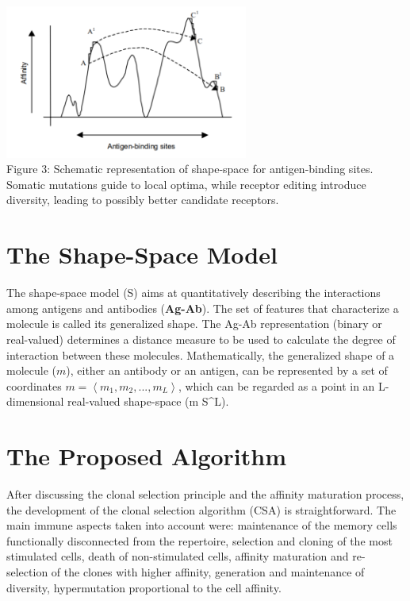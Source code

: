 \documentclass{article}
\begin{document}
\begin{center} 
\includegraphics[width=8cm,clip]{images/cj_somatic_muta.png}\\
\caption{Figure 3: Schematic representation of shape-space for antigen-binding sites. Somatic mutations guide to local optima, while receptor editing introduce diversity, leading to possibly better candidate receptors.}	
\end{center} 


\section{The Shape-Space Model}
The shape-space model (S) aims at quantitatively describing the interactions among antigens and antibodies (\textbf{Ag-Ab}). The set of features that characterize a molecule
is called its generalized shape. The Ag-Ab representation (binary or real-valued) determines a distance measure to be used to calculate the degree of interaction between these molecules.  Mathematically, the generalized shape of a molecule (\begin{math} m\end{math}), either an antibody or an antigen, can be represented by a set of coordinates \begin{math} m =\left \langle m_1, m_2,..., m_L\right\rangle\end{math}, which can be regarded as a point in an L-dimensional real-valued shape-space (m \in S^L).

\section{The Proposed Algorithm}
After discussing the clonal selection principle and the affinity maturation process, the development of the clonal selection algorithm (CSA) is straightforward. The main immune aspects taken into account were: maintenance of the memory cells functionally disconnected from the repertoire, selection and cloning of the most stimulated cells, death of non-stimulated cells, affinity maturation and re-selection of the clones with higher affinity, generation and maintenance of diversity, hypermutation proportional to the cell affinity.
\end{document}
